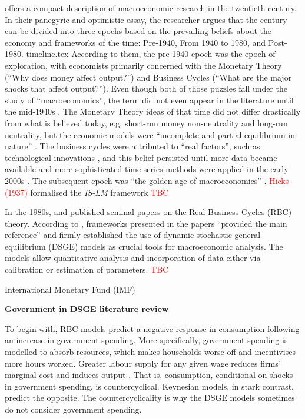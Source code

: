 \textcite{blanchard_2000_what} offers a compact description of macroeconomic research in the twentieth century. In their panegyric and optimistic essay, the researcher argues that the century can be divided into three epochs based on the prevailing beliefs about the economy and frameworks of the time: Pre-1940, From 1940 to 1980, and Post-1980. 
{timeline.tex}
According to them, the pre-1940 epoch was the epoch of exploration, with economists primarily concerned with the Monetary Theory (``Why does money affect output?'') and Business Cycles (``What are the major shocks that affect output?''). Even though both of those puzzles fall under the study of ``macroeconomics'', the term did not even appear in the literature until the mid-1940s \parencite{blanchard_2000_what}. The Monetary Theory ideas of that time did not differ drastically from what is believed today, e.g. short-run money non-neutrality and long-run neutrality, but the economic models were ``incomplete and partial equilibrium in nature'' \parencite[1377]{blanchard_2000_what}. The business cycles were attributed to ``real factors'', such as technological innovations \parencite{blanchard_2000_what}, and this belief persisted until more data became available and more sophisticated time series methods were applied in the early 2000s \parencite[3]{jordigal_2015_monetary}. The subsequent epoch was ``the golden age of macroeconomics'' \parencite[1379]{blanchard_2000_what}. \textcolor{red}{Hicks (1937)} formalised the \textit{IS-LM} framework \textcolor{red}{TBC}

In the 1980s, \textcite{kydland_1982_time} and \textcite{prescott_1986_theory} published seminal papers on the Real Business Cycles (RBC) theory. According to \textcite[2]{jordigal_2015_monetary}, frameworks presented in the papers ``provided the main reference'' and firmly established the use of dynamic stochastic general equilibrium (DSGE) models as crucial tools for macroeconomic analysis. The models allow quantitative analysis and incorporation of data either via calibration or estimation of parameters. \textcolor{red}{TBC}

International Monetary Fund (IMF)

\textbf{Government in DSGE literature review}

To begin with, RBC models predict a negative response in consumption following an increase in government spending. More specifically, government spending is modelled to absorb resources, which makes households worse off and incentivises more hours worked. Greater labour supply for any given wage reduces firms' marginal cost and induces output \parencite[319]{baxter_1993_fiscal}. That is, consumption, conditional on shocks in government spending, is countercyclical. Keynesian models, in stark contrast, predict the opposite. The countercyclicality is why the DSGE models sometimes do not consider government spending. 


